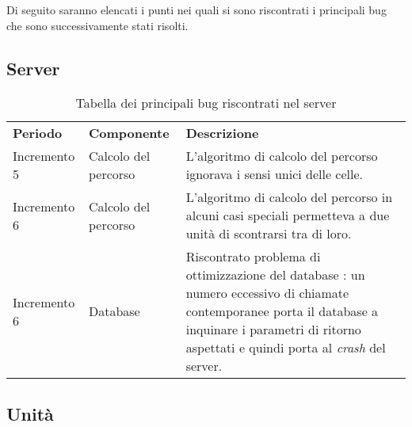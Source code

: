 Di seguito saranno elencati i punti nei quali si sono riscontrati i principali bug che sono successivamente stati risolti.

\subsection{Server}

\begin{table} [!ht]
	\begin{center}
		\begin{tabular} { m{2.5cm} m{2.5cm} m{11cm}  }
			\rowcolor{lightgray}
			\textbf{Periodo} & \textbf{Componente} & \textbf{Descrizione}\\

			Incremento 5 & Calcolo del percorso & L'algoritmo di calcolo del percorso ignorava i sensi unici delle celle.\\
			Incremento 6 & Calcolo del percorso & L'algoritmo di calcolo del percorso in alcuni casi speciali permetteva a due unità di scontrarsi tra di loro.\\
			Incremento 6 & Database & Riscontrato problema di ottimizzazione del database \glock{Redis}: un numero eccessivo
			di chiamate contemporanee porta il database a inquinare i parametri di ritorno aspettati e quindi porta
			al \textit{crash} del server.\\


		\end{tabular}
	\end{center}
	\caption{Tabella dei principali bug riscontrati nel server}
\end{table}

\subsection{Unità}

